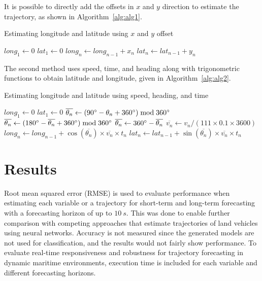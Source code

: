 \documentclass[preprint,12pt]{elsarticle}
\begin{document}
It is possible to directly add the offsets in $x$ and $y$ direction to estimate the trajectory, as shown in Algorithm~\ref{alg:alg1}.

\begin{algorithm}[H] 
\caption{Estimating longitude and latitude using $x$ and $y$ offset}\label{alg:alg1}
\begin{algorithmic} 
\STATE $long_{1} \gets 0$
\STATE $lat_{1} \gets 0$ 
\STATE $long_{n} \gets long_{n-1} + x_{n}$ 
\STATE $lat_{n} \gets lat_{n-1} + y_{n}$ 
\ENDFOR
\end{algorithmic}
\end{algorithm}
 
The second method uses speed, time, and heading along with trigonometric functions to obtain latitude and longitude, given in Algorithm~\ref{alg:alg2}.
 
\begin{algorithm}[H] 
\caption{Estimating longitude and latitude using speed, heading, and time}\label{alg:alg2}
\begin{algorithmic} 
\STATE $long_{1} \gets 0$
\STATE $lat_{1} \gets 0$
\STATE $\overline{\theta_{n}} \gets (90\degree - \theta_{n} + 360\degree) \bmod 360\degree$ 
 \STATE $\overline{\theta_{n}} \gets (180\degree - \overline{\theta_{n}} + 360\degree) \bmod 360\degree$  \ENDIF 
{} \STATE $\overline{\theta_{n}} \gets 360\degree - \overline{\theta_{n}}$ \ENDIF 
\STATE $\overline{v_{n}} \gets v_{n} / (111 \times 0.1 \times 3600)$
\STATE $long_{n} \gets long_{n-1} + \cos{\left(\overline{\theta_{n}}\right)} \times \overline{v_{n}} \times t_{n}$ 
\STATE $lat_{n} \gets lat_{n-1} + \sin{\left(\overline{\theta_{n}}\right)} \times \overline{v_{n}} \times t_{n}$ 
\ENDFOR
\end{algorithmic}
\end{algorithm}

\section{Results}
\label{sec:Results}

Root mean squared error (RMSE) is used to evaluate performance when estimating each variable or a trajectory for short-term and long-term forecasting with a forecasting horizon of up to $10 \ s$. This was done to enable further comparison with competing approaches that estimate trajectories of land vehicles using neural networks. Accuracy is not measured since the generated models are not used for classification, and the results would not fairly show performance. To evaluate real-time responsiveness and robustness for trajectory forecasting in dynamic maritime environments, execution time is included for each variable and different forecasting horizons.
\end{document}
